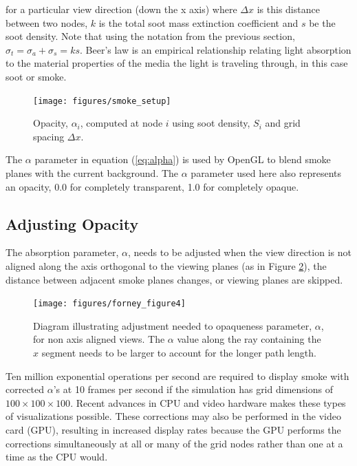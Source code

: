 \noindent for a particular view direction (down the x axis) where
$\Delta x$ is this distance between two nodes, $k$ is the total
soot mass extinction coefficient and $s$ be the soot density.
Note that using the notation from the previous section, $\sigma_t=\sigma_a+\sigma_s=ks$.  Beer's law is an empirical relationship relating light absorption
to the material properties of the media the light is traveling
through, in this case soot or smoke.

\begin{figure}[\figoptions]
\begin{center}
\texttt{[image: figures/smoke\_setup]}
\end{center}
\caption {Opacity, $\alpha_i$, computed at node $i$ using soot density, $S_i$ and grid spacing $\Delta x$.}
\label{figsmokesetup}
\end{figure}


The $\alpha$ parameter in equation (\ref{eq:alpha}) is used by
OpenGL to blend smoke planes with the current background.  The
$\alpha$ parameter used here also represents an opacity, 0.0 for
completely transparent, 1.0 for completely opaque.

%
%

\subsection{Adjusting Opacity}

The absorption parameter, $\alpha$, needs to be adjusted when the
view direction is not aligned along the axis orthogonal to the
viewing planes (as in Figure \ref{figray}), the distance between
adjacent smoke planes changes, or viewing planes are skipped.
\begin{figure}[\figoptions]
\centerline{\texttt{[image: figures/forney\_figure4]}}
\caption [Diagram illustrating the adjustment needed to opaqueness
parameter, $\alpha$, for non axis aligned views.] { Diagram
illustrating adjustment needed to opaqueness parameter, $\alpha$,
for non axis aligned views. The $\alpha$ value along the ray
containing the $\hat{x}$ segment needs to be larger to account for
the longer path length. } \label{figray}
\end{figure}

Ten million exponential operations per second are required to
display smoke with corrected $\alpha$'s at 10 frames per second if
the simulation has grid dimensions of $100\times 100\times 100$.
Recent advances in CPU and video hardware makes these types of
visualizations possible. These corrections may also be performed
in the video card (GPU), resulting in increased display rates
because the GPU performs the corrections simultaneously at all or
many of the grid nodes rather than one at a time as the CPU would.

